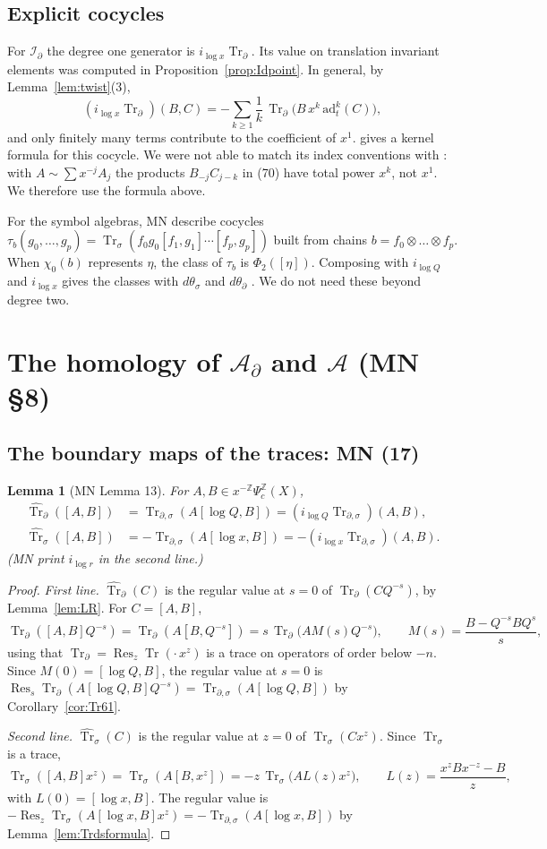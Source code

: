 \documentclass[11pt,oneside,reqno]{article}
\DeclareMathOperator{\Tr}{Tr}
\DeclareMathOperator{\Res}{Res}
\newcommand{\Z}{\mathbb Z}
\newcommand{\cA}{\mathcal A}
\newcommand{\Id}{\mathcal I_\partial}
\newcommand{\Ad}{\mathcal A_\partial}
\newcommand{\Psic}{\Psi_{c}}
\newcommand{\Trs}{\Tr_\sigma}
\newcommand{\Trd}{\Tr_\partial}
\newcommand{\Trds}{\Tr_{\partial,\sigma}}
\newcommand{\hTrs}{\widehat{\Tr}_\sigma}
\newcommand{\hTrd}{\widehat{\Tr}_\partial}
\newcommand{\lQ}{\log Q}
\newcommand{\lx}{\log x}
\theoremstyle{plain}
\newtheorem{lemma}[theorem]{Lemma}
\theoremstyle{definition}
\theoremstyle{remark}
\begin{document}
\subsection{Explicit cocycles}
For \(\Id\) the degree one generator is \(i_{\lx}\Trd\). Its value on
translation invariant elements was computed in
Proposition~\ref{prop:Idpoint}. In general, by Lemma~\ref{lem:twist}(3),
\[
 (i_{\lx}\Trd)(B,C)=-\sum_{k\ge1}\frac1k\,\Trd\bigl(B\,x^k\,
 \mathrm{ad}_t^k(C)\bigr),
\]
and only finitely many terms contribute to the coefficient of \(x^1\).
\cite[(70)]{MN} gives a kernel formula for this cocycle. We were not able
to match its index conventions with \cite[Lemma~10]{MN}: with
\(A\sim\sum x^{-j}A_j\) the products \(B_{-j}C_{j-k}\) in (70) have total
power \(x^k\), not \(x^1\). We therefore use the formula above.

For the symbol algebras, MN describe cocycles
\(\tau_b(g_0,\dots,g_p)=\Trs(f_0g_0[f_1,g_1]\cdots[f_p,g_p])\) built from
chains \(b=f_0\otimes\dots\otimes f_p\). When \(\chi_0(b)\) represents
\(\eta\), the class of \(\tau_b\) is \(\Phi_2([\eta])\). Composing with
\(i_{\lQ}\) and \(i_{\lx}\) gives the classes with \(d\theta_\sigma\) and
\(d\theta_\partial\) \cite[p.~24]{MN}. We do not need these beyond degree
two.

\section{The homology of \texorpdfstring{\(\Ad\)}{Ad} and \texorpdfstring{\(\cA\)}{A} (MN \S8)}
\label{sec:AdA}

\subsection{The boundary maps of the traces: MN (17)}

\begin{lemma}[MN Lemma 13]\label{lem:17}
For \(A,B\in x^{-\Z}\Psic^{\Z}(X)\),
\begin{align*}
 \hTrd([A,B])&=\Trds(A[\lQ,B])=(i_{\lQ}\Trds)(A,B),\\
 \hTrs([A,B])&=-\Trds(A[\lx,B])=-(i_{\lx}\Trds)(A,B).
\end{align*}
(MN print \(i_{\log r}\) in the second line.)
\end{lemma}

\begin{proof}
\emph{First line.} \(\hTrd(C)\) is the regular value at \(s=0\) of
\(\Trd(CQ^{-s})\), by Lemma~\ref{lem:LR}. For \(C=[A,B]\),
\[
 \Trd([A,B]Q^{-s})=\Trd(A[B,Q^{-s}])=s\,\Trd\bigl(AM(s)Q^{-s}\bigr),
 \qquad M(s)=\frac{B-Q^{-s}BQ^s}s ,
\]
using that \(\Trd=\Res_z\Tr(\cdot\,x^z)\) is a trace on operators of order
below \(-n\). Since \(M(0)=[\lQ,B]\), the regular value at \(s=0\) is
\(\Res_s\Trd(A[\lQ,B]Q^{-s})=\Trds(A[\lQ,B])\) by
Corollary~\ref{cor:Tr61}.

\emph{Second line.} \(\hTrs(C)\) is the regular value at \(z=0\) of
\(\Trs(Cx^z)\). Since \(\Trs\) is a trace,
\[
 \Trs([A,B]x^z)=\Trs(A[B,x^z])=-z\,\Trs\bigl(AL(z)x^z\bigr),\qquad
 L(z)=\frac{x^zBx^{-z}-B}z ,
\]
with \(L(0)=[\lx,B]\). The regular value is
\(-\Res_z\Trs(A[\lx,B]x^z)=-\Trds(A[\lx,B])\) by
Lemma~\ref{lem:Trdsformula}.
\end{proof}
\end{document}
